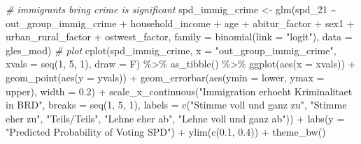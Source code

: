 \documentclass[
]{article}
\newenvironment{Shaded}{\begin{snugshade}}{\end{snugshade}}
\newcommand{\AttributeTok}[1]{\textcolor[rgb]{0.77,0.63,0.00}{#1}}
\newcommand{\CommentTok}[1]{\textcolor[rgb]{0.56,0.35,0.01}{\textit{#1}}}
\newcommand{\DecValTok}[1]{\textcolor[rgb]{0.00,0.00,0.81}{#1}}
\newcommand{\FloatTok}[1]{\textcolor[rgb]{0.00,0.00,0.81}{#1}}
\newcommand{\FunctionTok}[1]{\textcolor[rgb]{0.00,0.00,0.00}{#1}}
\newcommand{\NormalTok}[1]{#1}
\newcommand{\OtherTok}[1]{\textcolor[rgb]{0.56,0.35,0.01}{#1}}
\newcommand{\SpecialCharTok}[1]{\textcolor[rgb]{0.00,0.00,0.00}{#1}}
\newcommand{\StringTok}[1]{\textcolor[rgb]{0.31,0.60,0.02}{#1}}
\begin{document}
\begin{Shaded}
\begin{Highlighting}[]
\CommentTok{\# immigrants bring crime is significant }
\NormalTok{spd\_immig\_crime }\OtherTok{\textless{}{-}} \FunctionTok{glm}\NormalTok{(spd\_21 }\SpecialCharTok{\textasciitilde{}}\NormalTok{ out\_group\_immig\_crime }\SpecialCharTok{+}\NormalTok{ household\_income }\SpecialCharTok{+}\NormalTok{ age }\SpecialCharTok{+}\NormalTok{ abitur\_factor }\SpecialCharTok{+}\NormalTok{ sex1 }\SpecialCharTok{+}\NormalTok{ urban\_rural\_factor }\SpecialCharTok{+}\NormalTok{ ostwest\_factor, }\AttributeTok{family =} \FunctionTok{binomial}\NormalTok{(}\AttributeTok{link =} \StringTok{"logit"}\NormalTok{), }\AttributeTok{data =}\NormalTok{ gles\_mod)}
\CommentTok{\# plot }
\FunctionTok{cplot}\NormalTok{(spd\_immig\_crime, }\AttributeTok{x =} \StringTok{"out\_group\_immig\_crime"}\NormalTok{, }
      \AttributeTok{xvals =} \FunctionTok{seq}\NormalTok{(}\DecValTok{1}\NormalTok{, }\DecValTok{5}\NormalTok{, }\DecValTok{1}\NormalTok{), }\AttributeTok{draw =}\NormalTok{ F) }\SpecialCharTok{\%\textgreater{}\%}
  \FunctionTok{as\_tibble}\NormalTok{() }\SpecialCharTok{\%\textgreater{}\%}
  \FunctionTok{ggplot}\NormalTok{(}\FunctionTok{aes}\NormalTok{(}\AttributeTok{x =}\NormalTok{ xvals)) }\SpecialCharTok{+}
  \FunctionTok{geom\_point}\NormalTok{(}\FunctionTok{aes}\NormalTok{(}\AttributeTok{y =}\NormalTok{ yvals)) }\SpecialCharTok{+}
  \FunctionTok{geom\_errorbar}\NormalTok{(}\FunctionTok{aes}\NormalTok{(}\AttributeTok{ymin =}\NormalTok{ lower, }\AttributeTok{ymax =}\NormalTok{ upper), }\AttributeTok{width =} \FloatTok{0.2}\NormalTok{) }\SpecialCharTok{+}
  \FunctionTok{scale\_x\_continuous}\NormalTok{(}\StringTok{"Immigration erhoeht Kriminalitaet in BRD"}\NormalTok{, }
                     \AttributeTok{breaks =} \FunctionTok{seq}\NormalTok{(}\DecValTok{1}\NormalTok{, }\DecValTok{5}\NormalTok{, }\DecValTok{1}\NormalTok{), }
                     \AttributeTok{labels =} \FunctionTok{c}\NormalTok{(}\StringTok{"Stimme voll und ganz zu"}\NormalTok{, }\StringTok{"Stimme eher zu"}\NormalTok{, }
                                \StringTok{"Teils/Teils"}\NormalTok{, }\StringTok{"Lehne eher ab"}\NormalTok{, }
                                \StringTok{"Lehne voll und ganz ab"}\NormalTok{)) }\SpecialCharTok{+}
  \FunctionTok{labs}\NormalTok{(}\AttributeTok{y =} \StringTok{"Predicted Probability of Voting SPD"}\NormalTok{) }\SpecialCharTok{+}
  \FunctionTok{ylim}\NormalTok{(}\FunctionTok{c}\NormalTok{(}\FloatTok{0.1}\NormalTok{, }\FloatTok{0.4}\NormalTok{)) }\SpecialCharTok{+}
  \FunctionTok{theme\_bw}\NormalTok{() }
\end{Highlighting}
\end{Shaded}
\end{document}
